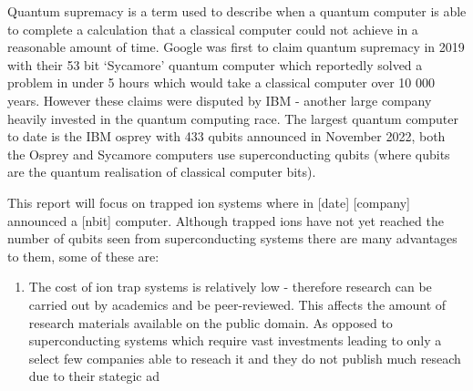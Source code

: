 Quantum supremacy is a term used to describe when a quantum computer is able to complete a calculation that a classical computer could not achieve in a reasonable amount of time. 
Google was first to claim quantum supremacy in 2019 with their 53 bit `Sycamore' quantum computer which reportedly solved a problem in under 5 hours which would take a classical computer over 10 000 years. \cite{gibney_hello_2019} 
However these claims were disputed by IBM - another large company heavily invested in the quantum computing race.
The largest quantum computer to date is the IBM osprey with 433 qubits announced in November 2022, both the Osprey and Sycamore computers use superconducting qubits (where qubits are the quantum realisation of classical computer bits).

This report will focus on trapped ion systems where in [date] [company] announced a [nbit] computer. Although trapped ions have not yet reached the number of qubits seen from superconducting systems there are many advantages to them, some of these are: 
\begin{enumerate}
    \item The cost of ion trap systems is relatively low - therefore research can be carried out by academics and be peer-reviewed. This affects the amount of research materials available on the public domain. As opposed to superconducting systems which require vast investments leading to only a select few companies able to reseach it and they do not publish much reseach due to their stategic ad
\end{enumerate}